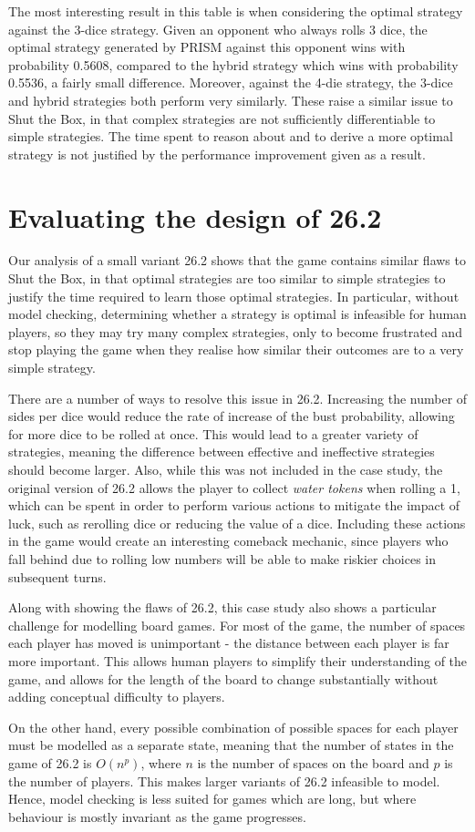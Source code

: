 The most interesting result in this table is when considering the optimal strategy against the 3-dice strategy. Given an opponent who always rolls 3 dice, the optimal strategy generated by PRISM against this opponent wins with probability 0.5608, compared to the hybrid strategy which wins with probability 0.5536, a fairly small difference. Moreover, against the 4-die strategy, the 3-dice and hybrid strategies both perform very similarly. These raise a similar issue to Shut the Box, in that complex strategies are not sufficiently differentiable to simple strategies. The time spent to reason about and to derive a more optimal strategy is not justified by the performance improvement given as a result.

\section{Evaluating the design of 26.2}
\label{cs3:eval_262}

Our analysis of a small variant 26.2 shows that the game contains similar flaws to Shut the Box, in that optimal strategies are too similar to simple strategies to justify the time required to learn those optimal strategies. In particular, without model checking, determining whether a strategy is optimal is infeasible for human players, so they may try many complex strategies, only to become frustrated and stop playing the game when they realise how similar their outcomes are to a very simple strategy.

There are a number of ways to resolve this issue in 26.2. Increasing the number of sides per dice would reduce the rate of increase of the bust probability, allowing for more dice to be rolled at once. This would lead to a greater variety of strategies, meaning the difference between effective and ineffective strategies should become larger. Also, while this was not included in the case study, the original version of 26.2 allows the player to collect \emph{water tokens} when rolling a 1, which can be spent in order to perform various actions to mitigate the impact of luck, such as rerolling dice or reducing the value of a dice. Including these actions in the game would create an interesting comeback mechanic, since players who fall behind due to rolling low numbers will be able to make riskier choices in subsequent turns.

Along with showing the flaws of 26.2, this case study also shows a particular challenge for modelling board games. For most of the game, the number of spaces each player has moved is unimportant - the distance between each player is far more important. This allows human players to simplify their understanding of the game, and allows for the length of the board to change substantially without adding conceptual difficulty to players.

On the other hand, every possible combination of possible spaces for each player must be modelled as a separate state, meaning that the number of states in the game of 26.2 is $O(n^p)$, where $n$ is the number of spaces on the board and $p$ is the number of players. This makes larger variants of 26.2 infeasible to model. Hence, model checking is less suited for games which are long, but where behaviour is mostly invariant as the game progresses.